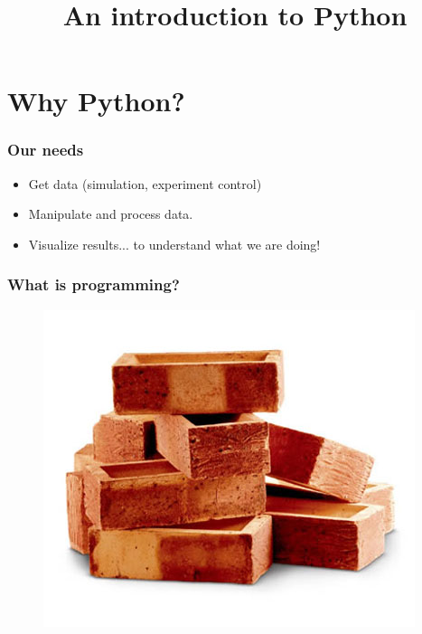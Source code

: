 \documentclass[xcolor=dvipsnames]{beamer}
\title{\textbf{An introduction to Python}}
\date{}
\begin{document}
\lstset{language=Python}

\begin{frame}[t]
  \maketitle
  \vskip -9em
\end{frame}




\section{Why Python?}

\begin{frame}
\frametitle{Our needs}

\begin{itemize}
\item Get data (simulation, experiment control)
\item Manipulate and process data.
\item Visualize results... to understand what we are doing!
\end{itemize}

\end{frame}


\begin{frame}
\frametitle{What is programming?}

\begin{figure}
\begin{center}
\includegraphics{images/bricks.jpg}
\end{center}
\end{figure}
\end{frame}
\end{document}
